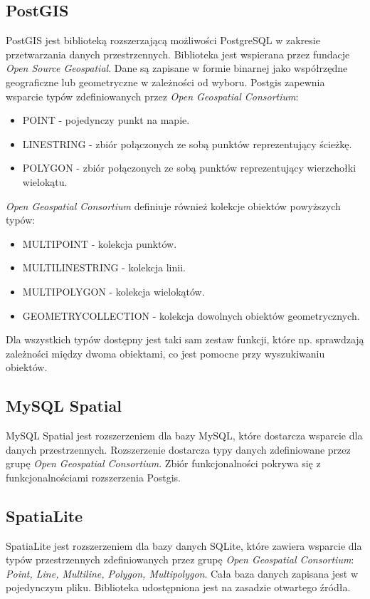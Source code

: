 \documentclass[printmode]{mgr}
\begin{document}
\subsection{PostGIS}
PostGIS jest biblioteką rozszerzającą możliwości PostgreSQL w zakresie przetwarzania danych przestrzennych. Biblioteka jest wspierana przez fundacje \textit{Open Source Geospatial}\cite{doc_postgis}. Dane są zapisane w formie binarnej jako współrzędne geograficzne lub geometryczne w zależności od wyboru. Postgis zapewnia wsparcie typów zdefiniowanych przez \textit{Open Geospatial Consortium}:
\begin{itemize}
  \item POINT - pojedynczy punkt na mapie.
  \item LINESTRING - zbiór połączonych ze sobą punktów reprezentujący ścieżkę.
  \item POLYGON - zbiór połączonych ze sobą punktów reprezentujący wierzchołki wielokątu.
\end{itemize}
\textit{Open Geospatial Consortium} definiuje również kolekcje obiektów powyższych typów:
\begin{itemize}
  \item MULTIPOINT - kolekcja punktów.
  \item MULTILINESTRING - kolekcja linii.
  \item MULTIPOLYGON - kolekcja wielokątów.
  \item GEOMETRYCOLLECTION - kolekcja dowolnych obiektów geometrycznych.
\end{itemize}
Dla wszystkich typów dostępny jest taki sam zestaw funkcji, które np. sprawdzają zależności między dwoma obiektami, co jest pomocne przy wyszukiwaniu obiektów.

\subsection{MySQL Spatial}
MySQL Spatial jest rozszerzeniem dla bazy MySQL, które dostarcza wsparcie dla danych przestrzennych. Rozszerzenie dostarcza typy danych zdefiniowane przez grupę \textit{Open Geospatial Consortium}\cite{doc_mysql}. Zbiór funkcjonalności pokrywa się z funkcjonalnościami rozszerzenia Postgis.
\subsection{SpatiaLite}
SpatiaLite jest rozszerzeniem dla bazy danych SQLite, które zawiera wsparcie dla typów przestrzennych zdefiniowanych przez grupę \textit{Open Geospatial Consortium}\cite{doc_spatialite}: \textit{Point, Line, Multiline, Polygon, Multipolygon}. Cała baza danych zapisana jest w pojedynczym pliku. Biblioteka udostępniona jest na zasadzie otwartego źródła.
\end{document}
